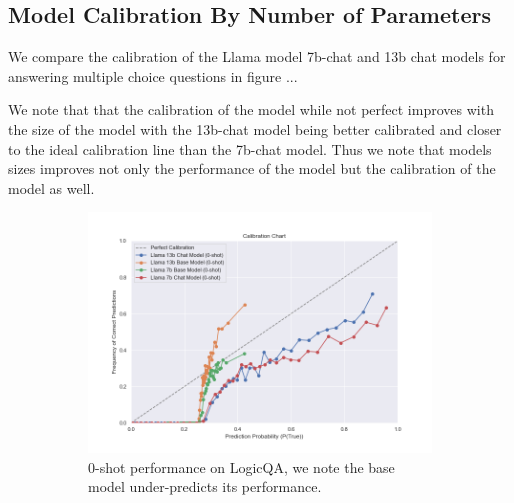 \documentclass[11pt]{article}
\begin{document}
\subsection{Model Calibration By Number of Parameters}

We compare the calibration of the Llama \cite{touvron2023llama} model 
7b-chat and 13b chat models for answering multiple choice questions in 
figure ... 

We note that that the calibration of the model while not perfect improves 
with the size of the model with the 13b-chat model being better calibrated 
and closer to the ideal calibration line than the 7b-chat model. Thus we 
note that models sizes improves not only the performance of the model but
the calibration of the model as well.

\begin{figure}
     \centering
     \begin{subfigure}[b]{0.60\textwidth}
         \centering \includegraphics[width=1.0\textwidth]{figures/0-shot-logic-qa.png}
         \caption{0-shot performance on LogicQA, we note the base model under-predicts its performance.}
         \label{fig:0-shot-MMLU}
     \end{subfigure}
     \hfill
     \begin{subfigure}[b]{0.38\textwidth}

\end{subfigure}
\end{figure}
\end{document}
